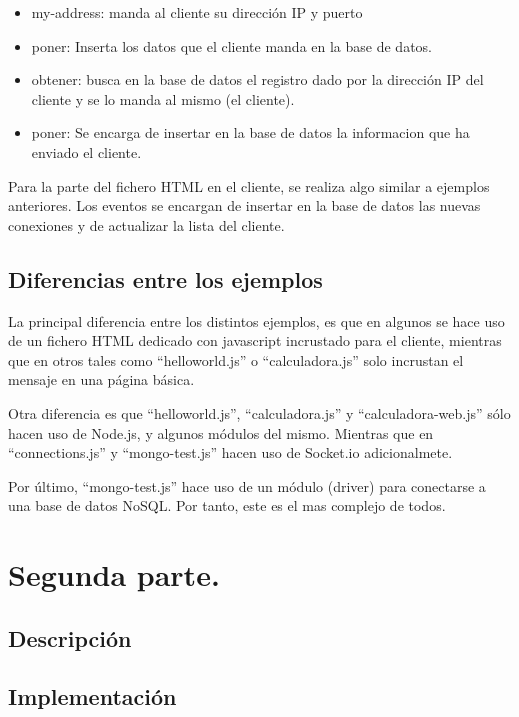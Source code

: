 \documentclass{article}
\begin{document}
\begin{itemize}
    \item my-address: manda al cliente su dirección IP y puerto
    \item poner: Inserta los datos que el cliente manda en la base de datos.
    \item obtener: busca en la base de datos el registro dado por la dirección IP del cliente y se lo manda al mismo (el cliente).
    \item poner: Se encarga de insertar en la base de datos la informacion que ha enviado el cliente.
\end{itemize}

Para la parte del fichero HTML en el cliente, se realiza algo similar a ejemplos anteriores. Los eventos se encargan de insertar en la base de datos las nuevas conexiones y de actualizar la lista del cliente.

\subsection{Diferencias entre los ejemplos}
La principal diferencia entre los distintos ejemplos, es que en algunos se hace uso de un fichero HTML dedicado con javascript incrustado para el cliente, mientras que en otros tales como ``helloworld.js'' o ``calculadora.js'' solo incrustan el mensaje en una página básica.

Otra diferencia es que ``helloworld.js'', ``calculadora.js'' y ``calculadora-web.js'' sólo hacen uso de Node.js, y algunos módulos del mismo. Mientras que en ``connections.js'' y ``mongo-test.js'' hacen uso de Socket.io adicionalmete.

Por último, ``mongo-test.js'' hace uso de un módulo (driver) para conectarse a una base de datos NoSQL. Por tanto, este es el mas complejo de todos.
\section{Segunda parte.}
\subsection{Descripción}
\subsection{Implementación}
\end{document}
